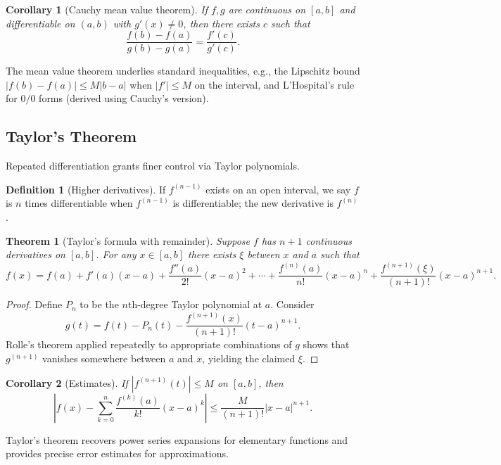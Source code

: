 \documentclass{article}
\theoremstyle{definition}
\newtheorem{definition}{Definition}[section]
\theoremstyle{plain}
\newtheorem{theorem}{Theorem}[section]
\newtheorem{corollary}{Corollary}[theorem]
\begin{document}
\begin{corollary}[Cauchy mean value theorem]\label{cor:cauchy-mvt}
	If $f,g$ are continuous on $[a,b]$ and differentiable on $(a,b)$ with $g'(x)\neq 0$, then there exists $c$ such that
	\[
		\frac{f(b)-f(a)}{g(b)-g(a)} = \frac{f'(c)}{g'(c)}.
	\]
\end{corollary}

The mean value theorem underlies standard inequalities, e.g., the Lipschitz bound $|f(b)-f(a)|\le M|b-a|$ when $|f'|\le M$ on the interval, and L'Hospital's rule for $0/0$ forms (derived using Cauchy's version).

\subsection{Taylor's Theorem}\label{subsec:taylor}
Repeated differentiation grants finer control via Taylor polynomials.
\begin{definition}[Higher derivatives]\label{def:higher-derivative}
	If $f^{(n-1)}$ exists on an open interval, we say $f$ is $n$ times differentiable when $f^{(n-1)}$ is differentiable; the new derivative is $f^{(n)}$.
\end{definition}

\begin{theorem}[Taylor's formula with remainder]\label{thm:taylor}
	Suppose $f$ has $n+1$ continuous derivatives on $[a,b]$. For any $x\in [a,b]$ there exists $\xi$ between $x$ and $a$ such that
	\[
		f(x) = f(a) + f'(a)(x-a) + \frac{f''(a)}{2!}(x-a)^2 + \cdots + \frac{f^{(n)}(a)}{n!}(x-a)^n + \frac{f^{(n+1)}(\xi)}{(n+1)!}(x-a)^{n+1}.
	\]
\end{theorem}
\begin{proof}
	Define $P_n$ to be the $n$th-degree Taylor polynomial at $a$. Consider
	\[
		g(t) = f(t) - P_n(t) - \frac{f^{(n+1)}(x)}{(n+1)!}(t-a)^{n+1}.
	\]
	Rolle's theorem applied repeatedly to appropriate combinations of $g$ shows that $g^{(n+1)}$ vanishes somewhere between $a$ and $x$, yielding the claimed $\xi$.
\end{proof}

\begin{corollary}[Estimates]\label{cor:taylor-estimate}
	If $|f^{(n+1)}(t)|\le M$ on $[a,b]$, then
	\[
		\left|f(x) - \sum_{k=0}^n \frac{f^{(k)}(a)}{k!}(x-a)^k \right| \le \frac{M}{(n+1)!}|x-a|^{n+1}.
	\]
\end{corollary}

Taylor's theorem recovers power series expansions for elementary functions and provides precise error estimates for approximations.
		
\end{document}
